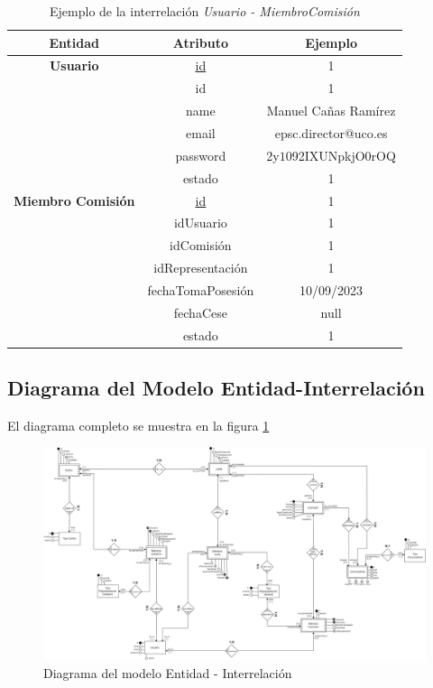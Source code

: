 \begin{itemize}
    \begin{table}[H]
    \centering
        \begin{tabular}{ | c | c | c |  }
             \hline
                 \textbf{Entidad} & \textbf{Atributo} & \textbf{Ejemplo}\\       
             \hline
                 \textbf{Usuario}  & \underline{id} & 1\\
                  & id & 1\\
                  & name & Manuel Cañas Ramírez\\
                  & email & epsc.director@uco.es\\
                  & password & 2y$10$92IXUNpkjO0rOQ\\
                  & estado & 1\\
              \hline
                  \textbf{Miembro Comisión}  & \underline{id} & 1\\
                  & idUsuario & 1\\
                  & idComisión & 1\\
                  & idRepresentación & 1\\
                  & fechaTomaPosesión & 10/09/2023\\
                  & fechaCese & null\\
                  & estado & 1\\
        \end{tabular}
        \caption{Ejemplo de la interrelación \textit{Usuario - MiembroComisión}}
        \label{table:I-Usu-MiCom}
    \end{table}
\end{itemize}

\begin{landscape}
\section{Diagrama del Modelo Entidad-Interrelación}\label{sec:diagrama-E-R}
El diagrama completo se muestra en la figura \ref{fig:EER_v5}
\begin{figure}[H]
    \centering
    \includegraphics[scale=0.35]{img/diagramas/EER/EER_v5.png}
    \caption{Diagrama del modelo Entidad - Interrelación}
    \label{fig:EER_v5}
\end{figure}
\end{landscape}
